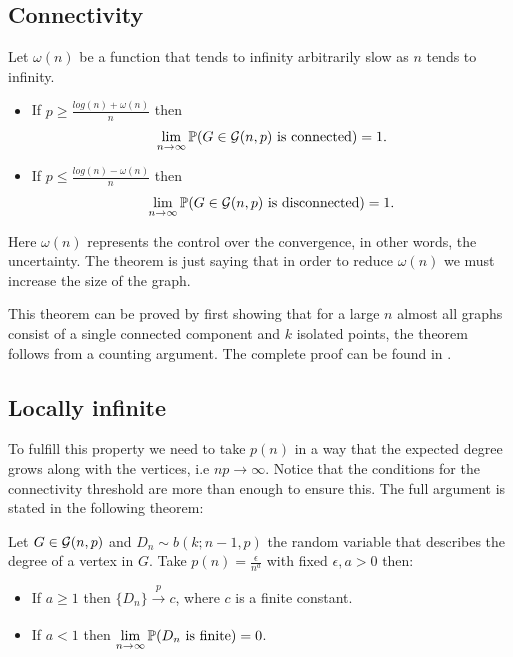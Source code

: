\subsection{Connectivity}
\begin{theorem}\label{connectivityER}
Let $\omega(n)$ be a function that tends to infinity arbitrarily slow as $n$ tends to infinity.
\begin{itemize}
\item If $p\geq \frac{log(n)+ \omega(n)}{n}$ then 
$$\lim_{n \to \infty} \P(G \in \G(n,p) \text{ is connected}) = 1.$$
\item If $p\leq \frac{log(n)- \omega(n)}{n}$ then
$$\lim_{n \to \infty} \P(G \in \G(n,p) \text{ is disconnected}) = 1.$$
\end{itemize}
\end{theorem}
Here $\omega(n)$ represents the control over the convergence, in other words, the uncertainty. The theorem is just saying that in order to reduce $\omega(n)$ we must increase the size of the graph.

This theorem can be proved by first showing that for a large $n$ almost all graphs consist of a single connected component and $k$ isolated points, the theorem follows from a counting argument. The complete proof can be found in \cite[Erdős-Rényi, p.~59]{Erdos59}.
 
\subsection{Locally infinite}

To fulfill this property we need to take $p(n)$ in a way that the expected degree grows along with the vertices, i.e $n p\to \infty$. Notice that the conditions for the connectivity threshold are more than enough to ensure this. The full argument is stated in the following theorem:

\begin{theorem}\label{locallyInfiniteER}
Let $G \in \G(n,p)$ and $D_{n} \sim b(k; n-1,p)$ the random variable that describes the degree of a vertex in $G$. Take $p(n)=\frac{\epsilon}{n^{a}}$ with fixed $\epsilon,a >0$ then:
\begin{itemize}
    \item If $a\geq 1$ then $\{D_{n}\} \xrightarrow[]{p} c $, where $c$ is a finite constant.
    \item If $a<1$ then $\lim\limits_{n \to \infty} \P(D_n \text{ is finite}) = 0$.
\end{itemize}
\end{theorem}


